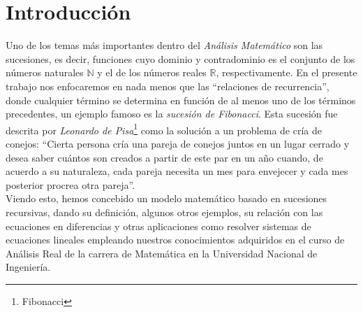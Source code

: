 \section{Introducción}
Uno de los temas más importantes dentro del \emph{Análisis Matemático} son las sucesiones, es decir, funciones cuyo dominio y contradominio es el conjunto de los números naturales $\mathds{N}$ y el de los números reales $\mathds{R}$, respectivamente. En el presente trabajo nos enfocaremos en nada menos que las ``relaciones de recurrencia'', donde cualquier  término se determina en función de al menos uno de los términos precedentes, un ejemplo famoso es la \emph{sucesión de Fibonacci}. Esta sucesión fue descrita por \emph{Leonardo de Pisa}\footnote{Fibonacci} como la solución a un problema de cría de conejos:
``Cierta persona cría una pareja de conejos juntos en un lugar cerrado y desea saber cuántos son creados a partir de este par en un año cuando, de acuerdo a su naturaleza, cada pareja necesita un mes para envejecer y cada mes posterior procrea otra pareja''.\\[\baselineskip]

Viendo esto, hemos concebido un modelo matemático basado en sucesiones recursivas, dando su definición, algunos otros ejemplos, su relación con las ecuaciones en diferencias y otras aplicaciones como resolver sistemas de ecuaciones lineales empleando nuestros conocimientos adquiridos en el curso de Análisis Real de la carrera de Matemática en la Universidad
Nacional de Ingeniería.